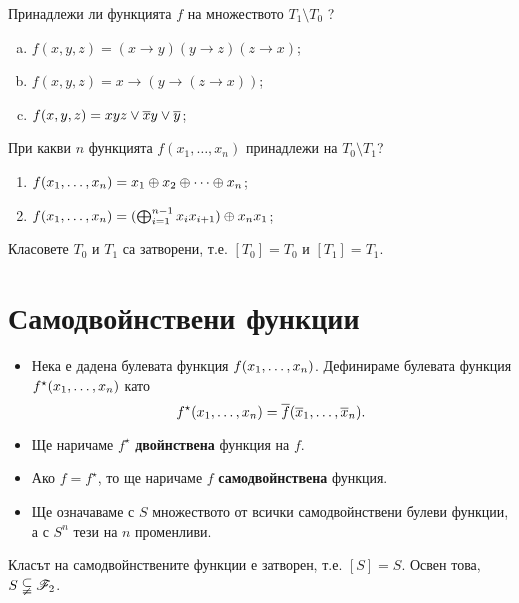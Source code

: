 \begin{problem}%
  Принадлежи ли функцията $f$ на множеството $T_1 \setminus T_0$ ?
  \begin{enumerate}[a)]
  \item
    $f(x,y,z) = (x\rightarrow y)(y\rightarrow z)(z\rightarrow x)$;
  \item
    $f(x,y,z) = x\rightarrow(y\rightarrow (z\rightarrow x))$;
  \item
    $f(x,y,z) = xyz \vee \overline{x}y \vee \overline{y}$;
  \end{enumerate}
\end{problem}

\begin{problem}
  При какви $n$ функцията $f(x_1,\dots, x_n)$ принадлежи на $T_0\setminus T_1$?
  \begin{enumerate}[1)]
  \item
    $f(x_{1},\dots,x_{n}) = x_1\oplus x_2 \oplus\dots\oplus x_n$;
  \item
    $f(x_{1},\dots,x_{n}) = (\bigoplus^{n-1}_{i=1} x_ix_{i+1})\oplus x_nx_1$;
  \end{enumerate}
\end{problem}

\begin{prop}
  Класовете $T_0$ и $T_1$ са затворени, т.е. $[T_0] = T_0$ и $[T_1] = T_1$.
\end{prop}


\section{Самодвойнствени функции}

\begin{itemize}
\item 
  Нека е дадена булевата функция $f(x_{1},\dots,x_{n})$. Дефинираме булевата функция $f^\star(x_{1},\dots,x_{n})$ като
  \[f^\star(x_{1},\dots,x_{n}) = \overline{f}(\overline{x}_1,\dots,\overline{x}_n).\]
\item
  Ще наричаме $f^\star$ {\bf двойнствена} функция на $f$.
\item
  Ако $f = f^\star$, то ще наричаме $f$ {\bf самодвойнствена} функция.
\item
  Ще означаваме с $S$ множеството от всички самодвойнствени булеви функции, а с $S^n$ тези на $n$ променливи.
\end{itemize}

\begin{prop}
  Класът на самодвойнствените функции е затворен, т.е. $[S] = S$.
  Освен това, $S \subsetneqq \mathscr{F}_2$.
\end{prop}


